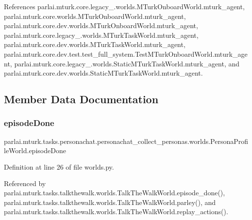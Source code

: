 References parlai.\+mturk.\+core.\+legacy\+\_.\+worlds.\+M\+Turk\+Onboard\+World.\+mturk\+\_\+agent, parlai.\+mturk.\+core.\+worlds.\+M\+Turk\+Onboard\+World.\+mturk\+\_\+agent, parlai.\+mturk.\+core.\+dev.\+worlds.\+M\+Turk\+Onboard\+World.\+mturk\+\_\+agent, parlai.\+mturk.\+core.\+legacy\+\_.\+worlds.\+M\+Turk\+Task\+World.\+mturk\+\_\+agent, parlai.\+mturk.\+core.\+dev.\+worlds.\+M\+Turk\+Task\+World.\+mturk\+\_\+agent, parlai.\+mturk.\+core.\+dev.\+test.\+test\+\_\+full\+\_\+system.\+Test\+M\+Turk\+Onboard\+World.\+mturk\+\_\+agent, parlai.\+mturk.\+core.\+legacy\+\_.\+worlds.\+Static\+M\+Turk\+Task\+World.\+mturk\+\_\+agent, and parlai.\+mturk.\+core.\+dev.\+worlds.\+Static\+M\+Turk\+Task\+World.\+mturk\+\_\+agent.



\subsection{Member Data Documentation}
\mbox{\label{classparlai_1_1mturk_1_1tasks_1_1personachat_1_1personachat__collect__personas_1_1worlds_1_1PersonaProfileWorld_a37e013e79d7dc8663813dc45340ea9a0}} 
\subsubsection{\texorpdfstring{episode\+Done}{episodeDone}}
{\footnotesize\ttfamily parlai.\+mturk.\+tasks.\+personachat.\+personachat\+\_\+collect\+\_\+personas.\+worlds.\+Persona\+Profile\+World.\+episode\+Done}



Definition at line 26 of file worlds.\+py.



Referenced by parlai.\+mturk.\+tasks.\+talkthewalk.\+worlds.\+Talk\+The\+Walk\+World.\+episode\+\_\+done(), parlai.\+mturk.\+tasks.\+talkthewalk.\+worlds.\+Talk\+The\+Walk\+World.\+parley(), and parlai.\+mturk.\+tasks.\+talkthewalk.\+worlds.\+Talk\+The\+Walk\+World.\+replay\+\_\+actions().

